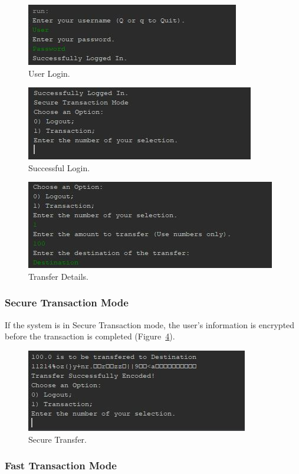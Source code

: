 \documentclass[12pt,twocolumn]{IEEEtran}
\begin{document}
\begin{figure}[h!]
	\centering
	\includegraphics[width=0.4\linewidth]{./Resources/cli-login.jpg}
	\caption{User Login.} \label{fig:userCreds}
\end{figure}

\begin{figure}[h!]
	\centering
	\includegraphics[width=0.4\linewidth]{./Resources/cli-loginSuccess.jpg}
	\caption{Successful Login.} \label{fig:menu}
\end{figure}


\begin{figure}[h!]
	\centering
	\includegraphics[width=0.4\linewidth]{./Resources/cli-details.jpg}
	\caption{Transfer Details.} \label{fig:transfer}
\end{figure}

\subsubsection{Secure Transaction Mode}

If the system is in Secure Transaction mode, the user's information is encrypted before the transaction is completed (Figure~\ref{fig:secure}).

\begin{figure}[h!]
	\centering
	\includegraphics[width=0.4\linewidth]{./Resources/cli-secure.jpg}
	\caption{Secure Transfer.} \label{fig:secure}
\end{figure}

\subsubsection{Fast Transaction Mode}
\end{document}
